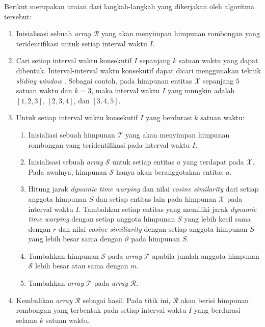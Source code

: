 \noindent Berikut merupakan uraian dari langkah-langkah yang dikerjakan oleh algoritma tersebut:

\begin{enumerate}
    \item Inisialisasi sebuah \textit{array} $\mathcal{R}$ yang akan menyimpan himpunan rombongan yang teridentifikasi untuk setiap interval waktu $I$.
    \item Cari setiap interval waktu konsekutif $I$ sepanjang $k$ satuan waktu yang dapat dibentuk. Interval-interval waktu konsekutif dapat dicari menggunakan teknik \textit{sliding window} \cite{ralf:03:sliding-window}. Sebagai contoh, pada himpunan entitas $\mathcal{X}$ sepanjang $5$ satuan waktu dan $k = 3$, maka interval waktu $I$ yang mungkin adalah $[1, 2, 3]$, $[2, 3, 4]$, dan $[3, 4, 5]$.
    \item Untuk setiap interval waktu konsekutif $I$ yang berdurasi $k$ satuan waktu:
    
    \begin{enumerate}
        \item Inisialiasi sebuah himpunan $\mathcal{T}$ yang akan menyimpan himpunan rombongan yang teridentifikasi pada interval waktu $I$.  
        \item Inisialisasi sebuah \textit{array} $\mathcal{S}$ untuk setiap entitas $a$ yang terdapat pada $\mathcal{X}$. Pada awalnya, himpunan $\mathcal{S}$ hanya akan beranggotakan entitas $a$.
        \item Hitung jarak \textit{dynamic time warping} dan nilai \textit{cosine similarity} dari setiap anggota himpunan $S$ dan setiap entitas lain pada himpunan $\mathcal{X}$ pada interval waktu $I$. Tambahkan setiap entitas yang memiliki jarak \textit{dynamic time warping} dengan setiap anggota himpunan $S$ yang lebih kecil sama dengan $r$ dan nilai \textit{cosine similiarity} dengan setiap anggota himpunan $S$ yang lebih besar sama dengan $\vartheta$ pada himpunan $S$.
        \item Tambahkan himpunan $\mathcal{S}$ pada \textit{array} $\mathcal{T}$ apabila jumlah anggota himpunan $\mathcal{S}$ lebih besar atau sama dengan $m$.
        \item Tambahkan \textit{array} $\mathcal{T}$ pada \textit{array} $\mathcal{R}$.
    \end{enumerate}
    \item Kembalikan \textit{array} $\mathcal{R}$ sebagai hasil. Pada titik ini, $\mathcal{R}$ akan berisi himpunan rombongan yang terbentuk pada setiap interval waktu $I$ yang berdurasi selama $k$ satuan waktu.
\end{enumerate}

